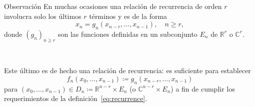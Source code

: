 \begin{frame}
\frametitle{\subsecname}
\begin{alertblock}{Observación}
En muchas ocasiones una relación de recurrencia de orden $r$ involucra solo los últimos $r$ términos y es de la forma \[ x_{n}=g_{n}\left(x_{n-r},\ldots,x_{n-1}\right),\quad n\geq r, \] donde ${\left(g_{n}\right)}_{n\geq r}$ son las funciones definidas en un subconjunto $E_{n}$ de $\mathds{R}^{r}$ o $\mathds{C}^{r}$.

\

Este último es de hecho una relación de recurrencia: es suficiente para establecer \[ f_{n}\left(x_{0},\ldots,x_{n-1}\right)\coloneqq g_{n}\left(x_{n-r},\ldots,x_{n-1}\right) \] para $\left(x_{0},\ldots,x_{n-1}\right)\in D_{n}\coloneqq\mathds{R}^{n-r}\times E_{n}$ (o $\mathds{C}^{n-r}\times E_{n}$) a fin de cumplir los requerimientos de la definición~\eqref{eq:recurrence}.
\end{alertblock}
\end{frame}